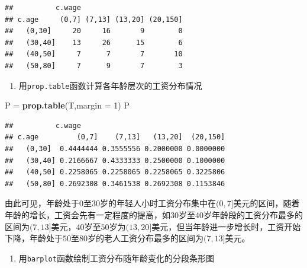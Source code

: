 \documentclass[]{article}
\newenvironment{Shaded}{\begin{snugshade}}{\end{snugshade}}
\newcommand{\DataTypeTok}[1]{\textcolor[rgb]{0.13,0.29,0.53}{#1}}
\newcommand{\DecValTok}[1]{\textcolor[rgb]{0.00,0.00,0.81}{#1}}
\newcommand{\FloatTok}[1]{\textcolor[rgb]{0.00,0.00,0.81}{#1}}
\newcommand{\KeywordTok}[1]{\textcolor[rgb]{0.13,0.29,0.53}{\textbf{#1}}}
\newcommand{\NormalTok}[1]{#1}
\newcommand{\OperatorTok}[1]{\textcolor[rgb]{0.81,0.36,0.00}{\textbf{#1}}}
\newcommand{\StringTok}[1]{\textcolor[rgb]{0.31,0.60,0.02}{#1}}
\providecommand{\tightlist}{%
  \setlength{\itemsep}{0pt}\setlength{\parskip}{0pt}}
\begin{document}
\begin{verbatim}
##          c.wage
## c.age     (0,7] (7,13] (13,20] (20,150]
##   (0,30]     20     16       9        0
##   (30,40]    13     26      15        6
##   (40,50]     7      7       7       10
##   (50,80]     7      9       7        3
\end{verbatim}

\begin{enumerate}
\def\labelenumi{\alph{enumi}.}
\setcounter{enumi}{2}
\tightlist
\item
  用\texttt{prop.table}函数计算各年龄层次的工资分布情况
\end{enumerate}

\begin{Shaded}
\begin{Highlighting}[]
\NormalTok{P =}\StringTok{ }\KeywordTok{prop.table}\NormalTok{(T,}\DataTypeTok{margin =} \DecValTok{1}\NormalTok{)}
\NormalTok{P}
\end{Highlighting}
\end{Shaded}

\begin{verbatim}
##          c.wage
## c.age         (0,7]    (7,13]   (13,20]  (20,150]
##   (0,30]  0.4444444 0.3555556 0.2000000 0.0000000
##   (30,40] 0.2166667 0.4333333 0.2500000 0.1000000
##   (40,50] 0.2258065 0.2258065 0.2258065 0.3225806
##   (50,80] 0.2692308 0.3461538 0.2692308 0.1153846
\end{verbatim}

由此可见，年龄处于\(0\)至\(30\)岁的年轻人小时工资分布集中在\((0,7]\)美元的区间，随着年龄的增长，工资会先有一定程度的提高，如\(30\)岁至\(40\)岁年龄段的工资分布最多的区间为\((7,13]\)美元，\(40\)岁至\(50\)岁为\((13,20]\)美元，但当年龄进一步增长时，工资开始下降，年龄处于\(50\)至\(80\)岁的老人工资分布最多的区间为\((7,13]\)美元。

\begin{enumerate}
\def\labelenumi{\alph{enumi}.}
\setcounter{enumi}{3}
\tightlist
\item
  用\texttt{barplot}函数绘制工资分布随年龄变化的分段条形图
\end{enumerate}

\begin{Shaded}
\end{Shaded}
\end{document}
